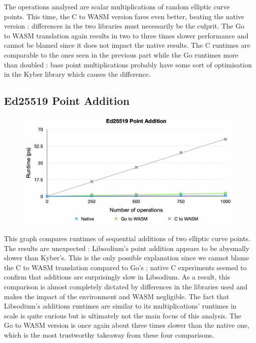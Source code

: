 \documentclass[11pt, a4paper, twoside, openright]{article}
\begin{document}
The operations analysed are scalar multiplications of random elliptic curve points. This time, the C to WASM version fares even better, beating the native version : differences in the two libraries must necessarily be the culprit. The Go to WASM translation again results in two to three times slower performance and cannot be blamed since it does not impact the native results. The C runtimes are comparable to the ones seen in the previous part while the Go runtimes more than doubled : base point multiplications probably have some sort of optimisation in the Kyber library which causes the difference.


\subsection{Ed25519 Point Addition}

\begin{figure}[H]
 \centering
  \includegraphics[width=13cm]{point_add.png}
\end{figure}

This graph compares runtimes of sequential additions of two elliptic curve points. The results are unexpected : Libsodium's point addition appears to be abysmally slower than Kyber's. This is the only possible explanation since we cannot blame the C to WASM translation compared to Go's ; native C experiments seemed to confirm that additions are surprisingly slow in Libsodium. As a result, this comparison is almost completely dictated by differences in the libraries used and makes the impact of the environment and WASM negligible. The fact that Libsodium's additions runtimes are similar to its multiplications' runtimes in scale is quite curious but is ultimately not the main focus of this analysis. The Go to WASM version is once again about three times slower than the native one, which is the most trustworthy takeaway from these four comparisons.
\end{document}
